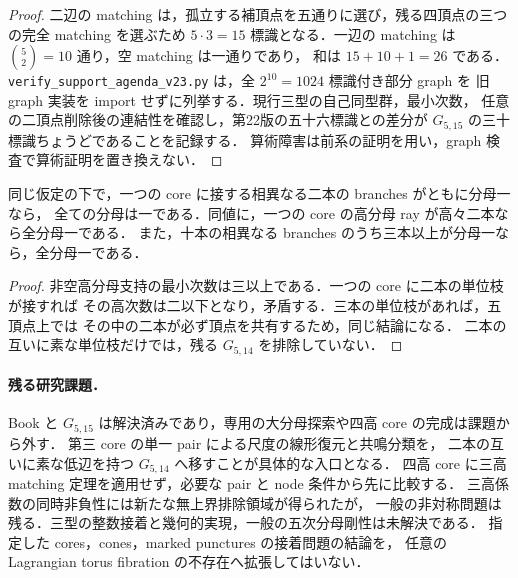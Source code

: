 \begin{proof}
二辺の matching は，孤立する補頂点を五通りに選び，残る四頂点の三つの完全 matching を選ぶため
$5\cdot3=15$ 標識となる．一辺の matching は $\binom52=10$ 通り，空 matching は一通りであり，
和は $15+10+1=26$ である．
\nolinkurl{verify_support_agenda_v23.py} は，全 $2^{10}=1024$ 標識付き部分 graph を
旧 graph 実装を import せずに列挙する．現行三型の自己同型群，最小次数，
任意の二頂点削除後の連結性を確認し，第22版の五十六標識との差分が
$G_{5,15}$ の三十標識ちょうどであることを記録する．
算術障害は前系の証明を用い，graph 検査で算術証明を置き換えない．
\end{proof}

\begin{corollary}[隣接する二本の単位分母からの伝播]
\label{sf23:adjacent-unit-branches}\label{sf22:three-unit-branches}
同じ仮定の下で，一つの core に接する相異なる二本の branches がともに分母一なら，
全ての分母は一である．同値に，一つの core の高分母 ray が高々二本なら全分母一である．
また，十本の相異なる branches のうち三本以上が分母一なら，全分母一である．
\end{corollary}

\begin{proof}
非空高分母支持の最小次数は三以上である．一つの core に二本の単位枝が接すれば
その高次数は二以下となり，矛盾する．三本の単位枝があれば，五頂点上では
その中の二本が必ず頂点を共有するため，同じ結論になる．
二本の互いに素な単位枝だけでは，残る $G_{5,14}$ を排除していない．
\end{proof}

\paragraph{残る研究課題．}
Book と $G_{5,15}$ は解決済みであり，専用の大分母探索や四高 core の完成は課題から外す．
第三 core の単一 pair による尺度の線形復元と共鳴分類を，
二本の互いに素な低辺を持つ $G_{5,14}$ へ移すことが具体的な入口となる．
四高 core に三高 matching 定理を適用せず，必要な pair と node 条件から先に比較する．
三高係数の同時非負性には新たな無上界排除領域が得られたが，
一般の非対称問題は残る．三型の整数接着と幾何的実現，一般の五次分母剛性は未解決である．
指定した cores，cones，marked punctures の接着問題の結論を，
任意の Lagrangian torus fibration の不存在へ拡張してはいない．
